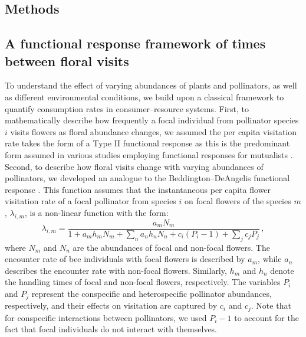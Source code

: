 \begin{refsection}
\section*{Methods}

\subsection*{A functional response framework of times between floral visits}

To understand the effect of varying abundances of plants and pollinators, as well as different environmental conditions, we build upon a classical framework to quantify consumption rates in consumer--resource systems. First, to mathematically describe how frequently a focal individual from pollinator species $i$ visits flowers as floral abundance changes, we assumed the per capita visitation rate takes the form of a Type II functional response \citep{holling1959some} as this is the predominant form assumed in various studies employing functional responses for mutualists \citep{holland2002population, valdovinos_adaptive_2013, bastolla2009architecture, rohr_structural_2014}. Second, to describe how floral visits change with varying abundances of pollinators, we developed an analogue to the Beddington--DeAngelis functional response \citep{beddington_mutual_1975,deangelis_model_1975}. This function assumes that the instantaneous per capita flower visitation rate of a focal pollinator from species $i$ on focal flowers of the species $m$, $\lambda_{i,m}$, is a non-linear function with the form:
\begin{equation}
    \label{lambda}
	\lambda_{i,m}  = \frac{a_{m}N_{m}}{1+a_{m}h_{m}N_{m}+ \sum_{n}a_{n}h_{n}N_{n} +c_{i}(P_{i}-1) + \sum_{j}c_{j} P _{j}} \,,
\end{equation}
where $N_{m}$ and $N_{n}$ are the abundances of focal and non-focal flowers. The encounter rate of bee individuals with focal flowers is described by $a_{m}$, while $a_{n}$ describes the encounter rate with non-focal flowers. Similarly, $h_{m}$ and $h_{n}$ denote the handling times of focal and non-focal flowers, respectively. The variables $P_{i}$ and $P_{j}$ represent the conspecific and heterospecific pollinator abundances, respectively, and their effects on visitation are captured by $c_{i}$ and $c_{j}$. Note that for conspecific interactions between pollinators, we used $P_{i}-1$ to account for the fact that focal individuals do not interact with themselves.


\end{refsection}
